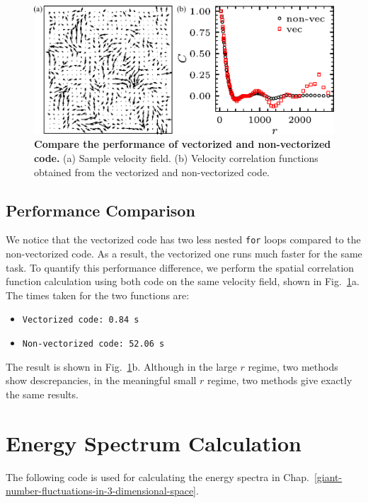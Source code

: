 \begin{figure}[!ht]
	\begin{center}
	\includegraphics[width=5.5in]{Figs/A-2/vectorization.pdf}
	\end{center}
	\caption[Compare the performance of vectorized and non-vectorized code]
	{
	\textbf{Compare the performance of vectorized and non-vectorized code.}
  (a) Sample velocity field.
  (b) Velocity correlation functions obtained from the vectorized and non-vectorized code.
	}
	\label{fig:vectorization-performance}
\end{figure}


\subsection{Performance Comparison}
We notice that the vectorized code has two less nested \texttt{for} loops compared to the non-vectorized code. As a result, the vectorized one runs much faster for the same task. To quantify this performance difference, we perform the spatial correlation function calculation using both code on the same velocity field, shown in Fig.~\ref{fig:vectorization-performance}a. The times taken for the two functions are:
\begin{itemize}
  \item \texttt{Vectorized code: 0.84 s}
  \item \texttt{Non-vectorized code: 52.06 s}
\end{itemize}
The result is shown in Fig.~\ref{fig:vectorization-performance}b. Although in the large $r$ regime, two methods show descrepancies, in the meaningful small $r$ regime, two methods give exactly the same results.


\section{Energy Spectrum Calculation}
\label{sec:A-energy-spectra}
The following code is used for calculating the energy spectra in Chap.~\ref{giant-number-fluctuations-in-3-dimensional-space}.

